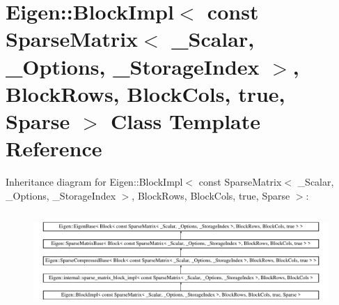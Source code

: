 \hypertarget{class_eigen_1_1_block_impl_3_01const_01_sparse_matrix_3_01___scalar_00_01___options_00_01___store3fd33d94eaf95572721ac85ec6beb63}{}\section{Eigen\+::Block\+Impl$<$ const Sparse\+Matrix$<$ \+\_\+\+Scalar, \+\_\+\+Options, \+\_\+\+Storage\+Index $>$, Block\+Rows, Block\+Cols, true, Sparse $>$ Class Template Reference}
\label{class_eigen_1_1_block_impl_3_01const_01_sparse_matrix_3_01___scalar_00_01___options_00_01___store3fd33d94eaf95572721ac85ec6beb63}
Inheritance diagram for Eigen\+::Block\+Impl$<$ const Sparse\+Matrix$<$ \+\_\+\+Scalar, \+\_\+\+Options, \+\_\+\+Storage\+Index $>$, Block\+Rows, Block\+Cols, true, Sparse $>$\+:\begin{figure}[H]
\begin{center}
\leavevmode
\includegraphics[height=3.645833cm]{class_eigen_1_1_block_impl_3_01const_01_sparse_matrix_3_01___scalar_00_01___options_00_01___store3fd33d94eaf95572721ac85ec6beb63}
\end{center}
\end{figure}
